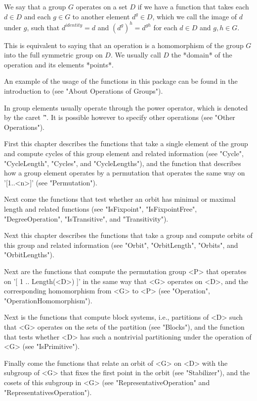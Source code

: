 We say that a group $G$ operates on a set $D$ if we  have a function that
takes each $d \in D$ and  each $g \in G$ to  another element $d^g \in D$,
which we  call the image of $d$  under $g$, such  that $d^{identity} = d$
and $(d^g)^h = d^{gh}$ for each $d \in D$ and $g,h \in G$.

This is equivalent to saying that  an operation is  a homomorphism of the
group $G$ into the full symmetric group on $D$.  We  usually call $D$ the
*domain* of the operation and its elements *points*.

An example of the usage of the functions in this  package can be found in
the introduction to {\GAP} (see "About Operations of Groups").

In  {\GAP}  group elements usually operate through  the  power  operator,
which is denoted by  the caret '\^'.  It is  possible  however to specify
other operations (see "Other Operations").

First this chapter describes the functions that take  a single element of
the group   and compute   cycles    of this  group  element and   related
information  (see "Cycle",  "CycleLength", "Cycles", and "CycleLengths"),
and the function   that  describes how  a group  element  operates  by  a
permutation that operates the same way on '[1..<n>]' (see "Permutation").

Next come the functions that test whether an orbit has minimal or maximal
length   and related    functions  (see "IsFixpoint",   "IsFixpointFree",
"DegreeOperation", "IsTransitive", and "Transitivity").

Next this chapter  describes the functions that  take a group and compute
orbits of this group and related information (see "Orbit", "OrbitLength",
"Orbits", and "OrbitLengths").

Next are the   functions that  compute  the permutation  group  <P>  that
operates on '[ 1 .. Length(<D>) ]' in  the same way  that <G> operates on
<D>, and the corresponding homomorphism from <G> to <P> (see "Operation",
"OperationHomomorphism").

Next is the functions that compute block systems, i.e., partitions of <D>
such that <G> operates on the  sets of the  partition (see "Blocks"), and
the function that tests whether  <D>  has such a nontrivial  partitioning
under the operation of <G> (see "IsPrimitive").

Finally come the  functions that relate an orbit  of <G> on <D> with  the
subgroup of  <G>   that  fixes  the   first  point  in  the  orbit   (see
"Stabilizer"), and    the   cosets  of   this   subgroup in      <G> (see
"RepresentativeOperation" and "RepresentativesOperation").

